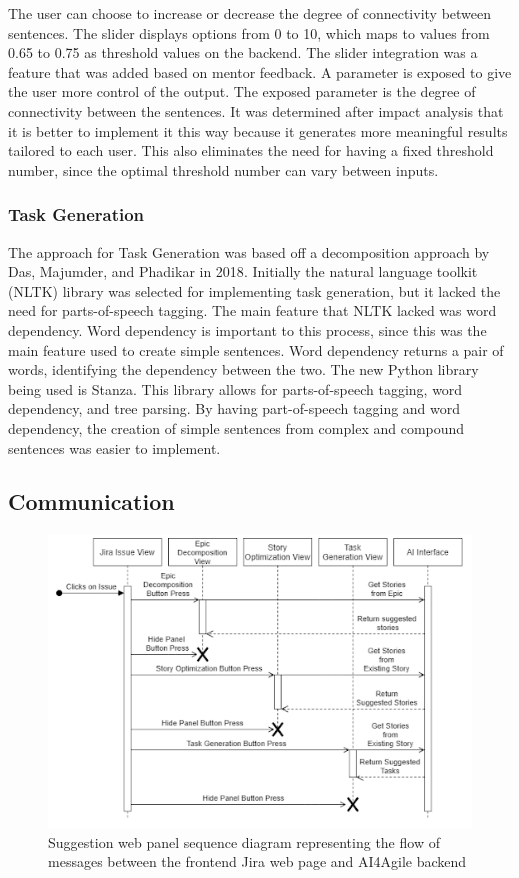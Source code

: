 The user can choose to increase or decrease the degree of connectivity between sentences. The slider displays options from 0 to 10, which maps to values from 0.65 to 0.75 as threshold values on the backend. The slider integration was a feature that was added based on mentor feedback. A parameter is exposed to give the user more control of the output. The exposed parameter is the degree of connectivity between the sentences. It was determined after impact analysis that it is better to implement it this way because it generates more meaningful results tailored to each user. This also eliminates the need for having a fixed threshold number, since the optimal threshold number can vary between inputs.

\subsubsection{Task Generation}
The approach for Task Generation was based off a decomposition approach by Das, Majumder, and Phadikar in 2018\cite{b3}. Initially the natural language toolkit (NLTK) library was selected for implementing task generation, but it lacked the need for parts-of-speech tagging. The main feature that NLTK lacked was word dependency. Word dependency is important to this process, since this was the main feature used to create simple sentences. Word dependency returns a pair of words, identifying the dependency between the two. The new Python library being used is Stanza. This library allows for parts-of-speech tagging, word dependency, and tree parsing. By having part-of-speech tagging and word dependency, the creation of simple sentences from complex and compound sentences was easier to implement.

\subsection{Communication}
\begin{figure}
\centerline{\includegraphics[width=\textwidth,height=\textheight,keepaspectratio]{./figure/SequenceFlowDiagram.png}}
\caption{Suggestion web panel sequence diagram representing the flow of messages between the frontend Jira web page and AI4Agile backend}
\end{figure}

